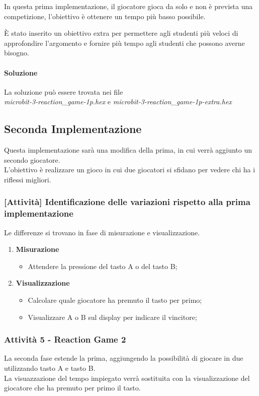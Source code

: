 \documentclass[../../docenti.tex]{subfiles}
\begin{document}
In questa prima implementazione, il giocatore gioca da solo e non è prevista una competizione, l'obiettivo è ottenere un tempo più basso possibile.

È stato inserito un obiettivo extra per permettere agli studenti più veloci di approfondire l'argomento e fornire più tempo agli studenti che possono averne bisogno.

\paragraph{Soluzione}
La soluzione può essere trovata nei file\\
 \textit{microbit-3-reaction\_game-1p.hex} e \textit{microbit-3-reaction\_game-1p-extra.hex}

\subsection{Seconda Implementazione}
\label{sec:reaction_game_2}

Questa implementazione sarà una modifica della prima, in cui verrà aggiunto un secondo giocatore.\\
L'obiettivo è realizzare un gioco in cui due giocatori si sfidano per vedere chi ha i riflessi migliori.

\subsubsection{[Attività] Identificazione delle variazioni rispetto alla prima implementazione}
Le differenze si trovano in fase di misurazione e visualizzazione.
\begin{enumerate}
	\item \textbf{Misurazione}
	\begin{itemize}
		\item Attendere la pressione del tasto A o del tasto B;
	\end{itemize}
	\item \textbf{Visualizzazione}
	\begin{itemize}
		\item Calcolare quale giocatore ha premuto il tasto per primo;
		\item Visualizzare A o B sul display per indicare il vincitore;
	\end{itemize}
\end{enumerate}

\subsubsection{Attività 5 - Reaction Game 2}
La seconda fase estende la prima, aggiungendo la possibilità di giocare in due utilizzando tasto A e tasto B.\\
La visuazzazione del tempo impiegato verrà sostituita con la visualizzazione del giocatore che ha premuto per primo il tasto.
\end{document}
